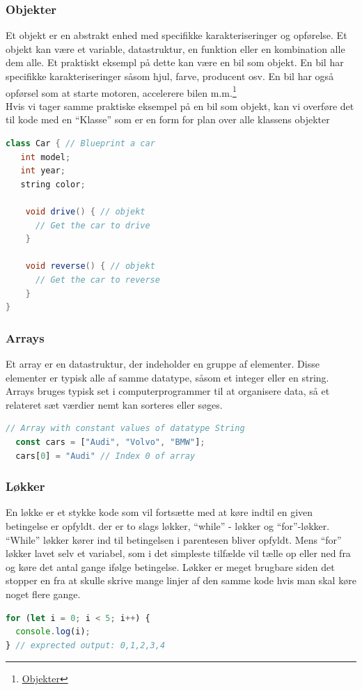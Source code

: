 \documentclass[12pt]{article}
\begin{document}

\subsubsection{Objekter}
Et objekt er en abstrakt enhed med specifikke karakteriseringer og opførelse. Et objekt kan være et variable, datastruktur, en funktion eller en kombination alle dem alle. Et praktiskt eksempl på dette kan være en bil som objekt. En bil har specifikke karakteriseringer såsom hjul, farve, producent osv. En bil har også opførsel som at starte motoren, accelerere bilen m.m.\footnote{\href{https://techterms.com/definition/object}{Objekter}} 
\\Hvis vi tager samme praktiske eksempel på en bil som objekt, kan vi overføre det til kode med en “Klasse” som er en form for plan over alle klassens objekter
\begin{lstlisting}[language=Java, caption=Eksempel på et objekt]
  class Car { // Blueprint a car
   int model;
   int year;
   string color;
   
    void drive() { // objekt
      // Get the car to drive
    }

    void reverse() { // objekt
      // Get the car to reverse
    }
}
\end{lstlisting}
\subsubsection{Arrays}
Et array er en datastruktur, der indeholder en gruppe af elementer. Disse elementer er typisk alle af samme datatype, såsom et integer eller en string. Arrays bruges typisk set i computerprogrammer til at organisere data, så et relateret sæt værdier nemt kan sorteres eller søges.
\begin{lstlisting}[language=JavaScript, caption=Eksempel på et array]
  // Array with constant values of datatype String
  const cars = ["Audi", "Volvo", "BMW"];
  cars[0] = "Audi" // Index 0 of array
\end{lstlisting}

\subsubsection{Løkker}
En løkke er et stykke kode som vil fortsætte med at køre indtil en given betingelse er opfyldt. der er to slags løkker, “while” - løkker og “for”-løkker. “While” løkker kører ind til betingelsen i parentesen bliver opfyldt. Mens “for” løkker lavet selv et variabel, som i det simpleste tilfælde vil tælle op eller ned fra og køre det antal gange ifølge betingelse. Løkker er meget brugbare siden det stopper en fra at skulle skrive mange linjer af den samme kode hvis man skal køre noget flere gange.
\begin{lstlisting}[language=JavaScript, caption=Eksempel på et for løkke]
for (let i = 0; i < 5; i++) {
  console.log(i);
} // exprected output: 0,1,2,3,4
\end{lstlisting}
\end{document}

